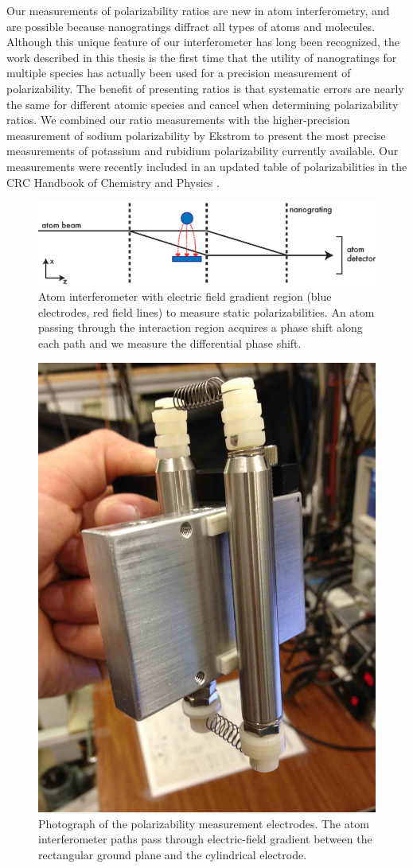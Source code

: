 Our measurements of polarizability ratios are new in atom interferometry, and are possible because nanogratings diffract all types of atoms and molecules. Although this unique feature of our interferometer has long been recognized, the work described in this thesis is the first time that the utility of nanogratings for multiple species has actually been used for a precision measurement of polarizability. The benefit of presenting ratios is that systematic errors are nearly the same for different atomic species and cancel when determining polarizability ratios. We combined our ratio measurements with the higher-precision measurement of sodium polarizability by Ekstrom \etal \cite{Eks95} to present the most precise measurements of potassium and rubidium polarizability currently available. Our measurements were recently included in an updated table of polarizabilities in the CRC Handbook of Chemistry and Physics \cite{Mil12}.


\begin{figure}
\includegraphics[width=1\textwidth]{Figures/ifmWith2010pol.eps}
\caption[Interferometer with polarizability measurement electrodes.]{\label{ifm2010pra} Atom interferometer with electric field gradient region (blue electrodes, red field lines) to measure static polarizabilities. An atom passing through the interaction region acquires a phase shift along each path and we measure the differential phase shift.}
\end{figure}


\begin{figure}
\centerline{\includegraphics[width=.40\textwidth]{Figures/intRegion2010photoCompMore.jpg}}
\caption[Photograph of the 2010 polarizability measurement electrodes.]{\label{int2010photo}Photograph of the polarizability measurement electrodes. The atom interferometer paths pass through electric-field gradient between the rectangular ground plane and the cylindrical electrode.}
\end{figure}


